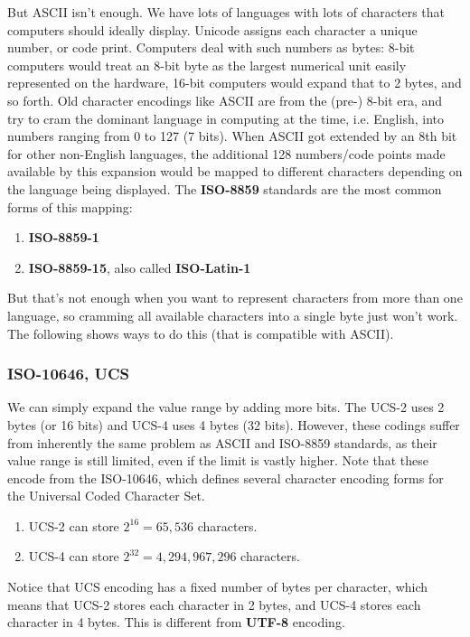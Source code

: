 \documentclass{article}
\begin{document}
  But ASCII isn't enough. We have lots of languages with lots of characters that computers should ideally display. Unicode assigns each character a unique number, or code print. Computers deal with such numbers as bytes: 8-bit computers would treat an 8-bit byte as the largest numerical unit easily represented on the hardware, 16-bit computers would expand that to 2 bytes, and so forth. Old character encodings like ASCII are from the (pre-) 8-bit era, and try to cram the dominant language in computing at the time, i.e. English, into numbers ranging from 0 to 127 (7 bits). When ASCII got extended by an 8th bit for other non-English languages, the additional 128 numbers/code points made available by this expansion would be mapped to different characters depending on the language being displayed. The \textbf{ISO-8859} standards are the most common forms of this mapping: 
  \begin{enumerate}
      \item \textbf{ISO-8859-1}
      \item \textbf{ISO-8859-15}, also called \textbf{ISO-Latin-1}
  \end{enumerate}
  But that's not enough when you want to represent characters from more than one language, so cramming all available characters into a single byte just won't work. The following shows ways to do this (that is compatible with ASCII). 

  \subsubsection{ISO-10646, UCS}
  We can simply expand the value range by adding more bits. The UCS-2 uses 2 bytes (or 16 bits) and UCS-4 uses 4 bytes (32 bits). However, these codings suffer from inherently the same problem as ASCII and ISO-8859 standards, as their value range is still limited, even if the limit is vastly higher. Note that these encode from the ISO-10646, which defines several character encoding forms for the Universal Coded Character Set. 
  \begin{enumerate}
      \item UCS-2 can store $2^{16} = 65,536$ characters. 
      \item UCS-4 can store $2^{32} = 4,294,967,296$ characters. 
  \end{enumerate}
  Notice that UCS encoding has a fixed number of bytes per character, which means that UCS-2 stores each character in 2 bytes, and UCS-4 stores each character in 4 bytes. This is different from \textbf{UTF-8} encoding. 
\end{document}
